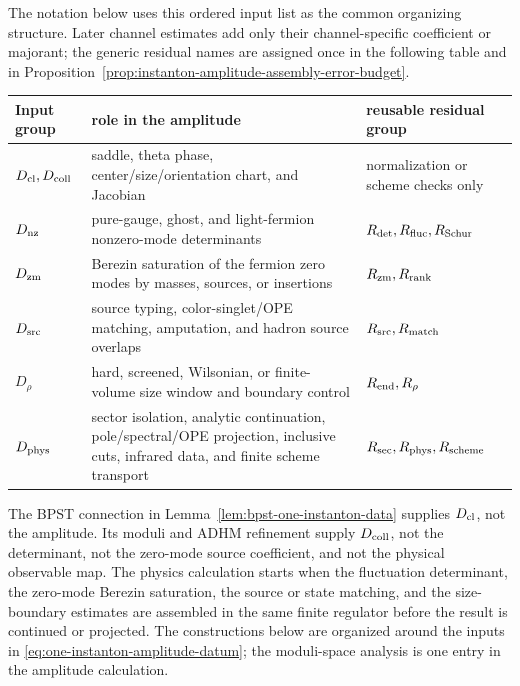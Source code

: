 The notation below uses this ordered input list as the common organizing
structure.  Later channel
estimates add only their channel-specific coefficient or majorant; the
generic residual names are assigned once in the following table and in
Proposition~\ref{prop:instanton-amplitude-assembly-error-budget}.
\begin{center}
\small
\begin{tabular}{
  >{\raggedright\arraybackslash}p{}
  >{\raggedright\arraybackslash}p{}
  >{\raggedright\arraybackslash}p{}}
\hline
Input group & role in the amplitude & reusable residual group \\
\hline
\(D_{\rm cl},D_{\rm coll}\)
& saddle, theta phase, center/size/orientation chart, and Jacobian
& normalization or scheme checks only \\
\(D_{\rm nz}\)
& pure-gauge, ghost, and light-fermion nonzero-mode determinants
& \(R_{\rm det},R_{\rm fluc},R_{\rm Schur}\) \\
\(D_{\rm zm}\)
& Berezin saturation of the fermion zero modes by masses, sources, or
insertions
& \(R_{\rm zm},R_{\rm rank}\) \\
\(D_{\rm src}\)
& source typing, color-singlet/OPE matching, amputation, and hadron source
overlaps
& \(R_{\rm src},R_{\rm match}\) \\
\(D_\rho\)
& hard, screened, Wilsonian, or finite-volume size window and boundary control
& \(R_{\rm end},R_\rho\) \\
\(D_{\rm phys}\)
& sector isolation, analytic continuation, pole/spectral/OPE projection,
inclusive cuts, infrared data, and finite scheme transport
& \(R_{\rm sec},R_{\rm phys},R_{\rm scheme}\) \\
\hline
\end{tabular}
\end{center}

The BPST connection in Lemma~\ref{lem:bpst-one-instanton-data} supplies
\(D_{\rm cl}\), not the amplitude.  Its moduli and ADHM refinement supply
\(D_{\rm coll}\), not the determinant, not the zero-mode source coefficient,
and not the physical observable map.  The physics calculation starts when the
fluctuation determinant, the zero-mode Berezin saturation, the source or
state matching, and the size-boundary estimates are assembled in the same
finite regulator before the result is continued or projected.  The
constructions below are organized around the inputs in
\eqref{eq:one-instanton-amplitude-datum}; the moduli-space analysis is one
entry in the amplitude calculation.

